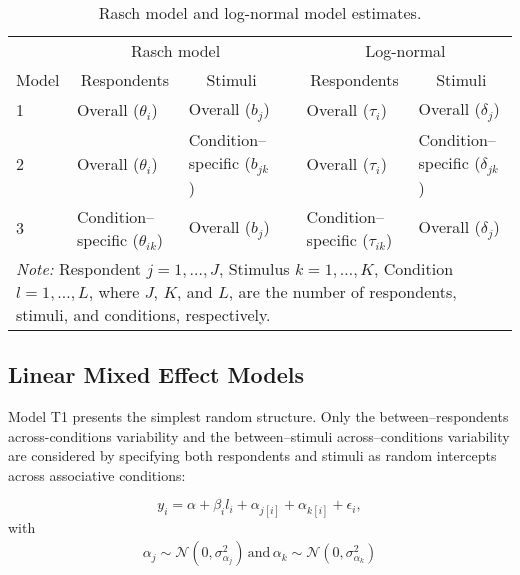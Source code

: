 \documentclass{book}
\begin{document}
%
\begin{table}[h!]
	\centering\doublespacing
	\caption{Rasch model and log-normal model estimates.}
	\label{tab:paroverview} 
	\begin{tabularx}{\textwidth}{l p{3cm} p{3cm} l p{3cm} p{3cm} }
		\toprule
		&\multicolumn{2}{c}{Rasch model}
		& & 
		\multicolumn{2}{c}{Log-normal}\\ 
		\cline{2-3}\cline{5-6} 
		Model & \multicolumn{1}{c}{Respondents} & \multicolumn{1}{c}{Stimuli} & & \multicolumn{1}{c}{Respondents} & \multicolumn{1}{c}{Stimuli} \\
		\midrule
				1 & Overall ($\theta_i$) & Overall ($b_j$) & & Overall  ($\tau_i$) & Overall ($\delta_j$) \\ 

		2 & Overall ($\theta_i$) & Condition--specific ($b_{jk}$) &  & Overall  ($\tau_i$)  & Condition--specific  ($\delta_{jk}$)  \\
		3 & Condition--specific ($\theta_{ik}$) & Overall ($b_j$) & & Condition--specific ($\tau_{ik}$)   & Overall  ($\delta_{j}$) \\
		\bottomrule
		\multicolumn{6}{p{\textwidth}}{\emph{Note:} Respondent $j = 1, \ldots, J$,  Stimulus $k = 1,\ldots, K$, Condition $l = 1,\ldots, L$, where $J$, $K$, and $L$, are the number of respondents, stimuli, and conditions, respectively.}
	\end{tabularx}
\end{table}

\subsection[LMMs]{Linear Mixed Effect Models}

Model T1 presents the simplest random structure. Only the between--respondents across-conditions variability and the between--stimuli across--conditions variability are considered by specifying both respondents and stimuli as random intercepts across associative conditions: 

\begin{equation}\label{LogtimeMin}
	y_{i} = \alpha + \beta_il_i + \alpha_{j[i]} +  \alpha_{k[i]} + \epsilon_{i},
\end{equation}
with
\begin{align}
	\alpha_{j} \sim  \mathcal{N} ( 0, \sigma_{\alpha_j}^2) \, \text{and} \, \alpha_{k}  \sim  \mathcal{N} (0,\sigma_{\alpha_k}^2)
\end{align}
\end{document}
